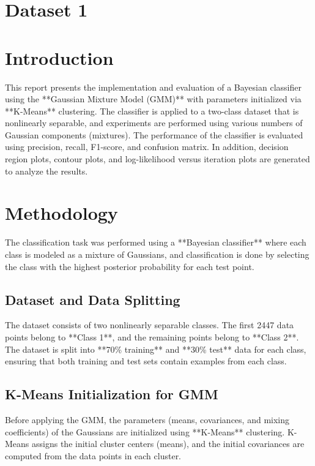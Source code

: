 \documentclass[conference]{IEEEtran}
\begin{document}
	
	\section{Dataset 1}
	
	\section{Introduction}
	
	This report presents the implementation and evaluation of a Bayesian classifier using the **Gaussian Mixture Model (GMM)** with parameters initialized via **K-Means** clustering. The classifier is applied to a two-class dataset that is nonlinearly separable, and experiments are performed using various numbers of Gaussian components (mixtures). The performance of the classifier is evaluated using precision, recall, F1-score, and confusion matrix. In addition, decision region plots, contour plots, and log-likelihood versus iteration plots are generated to analyze the results.
	
	\section{Methodology}
	
	The classification task was performed using a **Bayesian classifier** where each class is modeled as a mixture of Gaussians, and classification is done by selecting the class with the highest posterior probability for each test point.
	
	\subsection{Dataset and Data Splitting}
	The dataset consists of two nonlinearly separable classes. The first 2447 data points belong to **Class 1**, and the remaining points belong to **Class 2**. The dataset is split into **70\% training** and **30\% test** data for each class, ensuring that both training and test sets contain examples from each class.
	
	\subsection{K-Means Initialization for GMM}
	Before applying the GMM, the parameters (means, covariances, and mixing coefficients) of the Gaussians are initialized using **K-Means** clustering. K-Means assigns the initial cluster centers (means), and the initial covariances are computed from the data points in each cluster.
	
\end{document}
